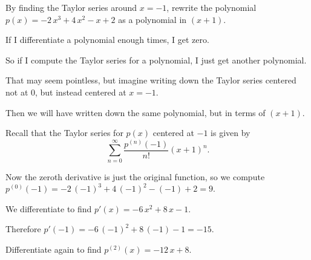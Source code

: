 \documentclass{ximera}
\begin{document}
            \begin{question}
              By finding the Taylor series around \(x = -1\), rewrite the polynomial \(p(x) = -2 \, x^{3} + 4 \, x^{2} - x + 2\) as a polynomial in \((x + 1)\).

              \begin{solution}
                \begin{hint}
                  If I differentiate a polynomial enough times, I get zero.
                \end{hint}
                \begin{hint}
                  So if I compute the Taylor series for a polynomial, I just get another polynomial.
                \end{hint}
                \begin{hint}
                  That may seem pointless, but imagine writing down the Taylor series centered not at \(0\), but instead centered at \(x = -1\).
                \end{hint}
                \begin{hint}
                  Then we will have written down the same polynomial, but in terms of \((x + 1)\).
                \end{hint}
                \begin{hint}
                  Recall that the Taylor series for \(p(x)\) centered at \(-1\) is given by \[\displaystyle\sum_{n=0}^\infty \displaystyle\frac{p^{(n)}(-1)}{n!} \left(x + 1\right)^n.\]
                \end{hint}
                \begin{hint}
                  Now the zeroth derivative is just the original function, so we compute \(p^{(0)}(-1) = -2 \, \left( -1 \right)^{3} + 4 \, \left( -1 \right)^{2} - \left( -1 \right) + 2 = 9\).
                \end{hint}
                \begin{hint}
                  We differentiate to find \(p'(x) = -6 \, x^{2} + 8 \, x - 1\).
                \end{hint}
                \begin{hint}
                  Therefore \(p'(-1) = -6 \, \left( -1 \right)^{2} + 8 \, \left( -1 \right) - 1 = -15\).
                \end{hint}
                \begin{hint}
                  Differentiate again to find \(p^{(2)}(x) = -12 \, x + 8\).

\end{hint}
\end{solution}
\end{question}
\end{document}
